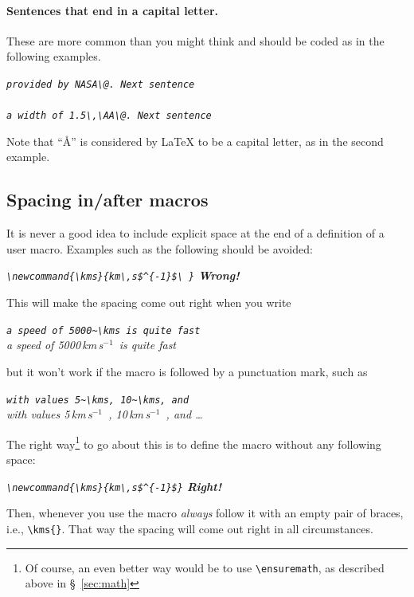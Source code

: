 \documentclass[debug]{rmaa}
\newcommand{\CS}[1]{\texttt{\textbackslash #1}}
\newenvironment{Example}
{\begin{list}{}{\setlength{\leftmargin}{10pt}\setlength{\rightmargin}{10pt}}%
  \item[]\itshape}
  {\end{list}}
\begin{document}
\paragraph{Sentences that end in a capital letter.} These are more common
than you might think and should be coded as in the following examples. 
\begin{Example}
  \verb+provided by NASA\@. Next sentence+\\
  \\[0.5\baselineskip]
  \verb+a width of 1.5\,\AA\@. Next sentence+\\
\end{Example}
Note that ``\AA'' is considered by \LaTeX{} to be a capital letter, as
in the second example. 



\subsection{Spacing in/after macros}
\label{sec:macrospace}
It is never a good idea to include explicit space at the end of a
definition of a user macro. Examples such as the following should be
avoided:
\begin{Example}
  \verb+\newcommand{\kms}{km\,s$^{-1}$\ }+ \hfill\textbf{Wrong!}
\end{Example}
This will make the spacing come out right when you write
\begin{Example}
  \newcommand{\kms}{km\,s$^{-1}$\ }
  \verb+a speed of 5000~\kms is quite fast+\\
  a speed of 5000\,\kms is quite fast
\end{Example}
but it won't work if the macro is followed by a punctuation mark, such
as 
\begin{Example}
  \newcommand{\kms}{km\,s$^{-1}$\ }
  \verb+with values 5~\kms, 10~\kms, and+\\
  with values 5\,\kms, 10\,\kms, and \dots
\end{Example}

The right way\footnote{Of course, an even better way would be to use
  \CS{ensuremath}, as described above in \S~\ref{sec:math}} to go
about this is to define the macro without any following space:
\begin{Example}
  \verb+\newcommand{\kms}{km\,s$^{-1}$}+ \hfill\textbf{Right!}
\end{Example}
Then, whenever you use the macro \emph{always} follow it with an empty
pair of braces, i.e., \verb+\kms{}+. That way the spacing will come
out right in all circumstances. 
\end{document}
